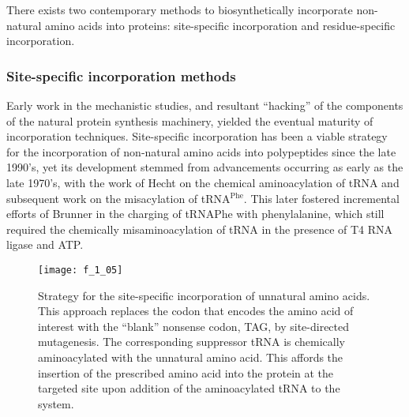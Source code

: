 \begin{refsection}
There exists two contemporary methods to biosynthetically incorporate
non-natural amino acids into proteins: site-specific incorporation and
residue-specific incorporation.

\subsubsection{Site-specific incorporation methods} 


Early work in the mechanistic studies, and resultant ``hacking'' of the
components of the natural protein synthesis machinery, yielded the eventual
maturity of incorporation techniques.  Site-specific incorporation has been a
viable strategy for the incorporation of non-natural amino acids into
polypeptides since the late 1990's, yet its development stemmed from
advancements occurring as early as the late 1970's, with the work of 
Hecht on the chemical aminoacylation of tRNA and subsequent work on the
misacylation of tRNA{$^\text{Phe}$}.\cite{Heckler1984,Hecht1978} This later
fostered incremental efforts of Brunner in the charging of tRNA{$\text{Phe}$}
with phenylalanine, which
still required the chemically misaminoacylation of tRNA in the presence of T4
RNA ligase and ATP.\cite{Baldini1988}
\begin{figure}[h!] \centering \texttt{[image: f\_1\_05]}
    \caption[Strategy for the site-specific incorporation of unnatural amino
    acids. This approach replaces the codon that encodes the amino acid of
    interest with the ``blank'' nonsense codon, TAG, by site-directed
    mutagenesis. The corresponding suppressor tRNA is chemically aminoacylated
     with the unnatural amino acid. This affords the insertion
    of the prescribed amino acid into the protein at the targeted site upon
    addition of the aminoacylated tRNA to the  system.]{Strategy for the site-specific incorporation of unnatural amino
    acids. This approach replaces the codon that encodes the amino acid of
    interest with the ``blank'' nonsense codon, TAG, by site-directed
    mutagenesis. The corresponding suppressor tRNA is chemically aminoacylated
     with the unnatural amino acid. This affords the insertion
    of the prescribed amino acid into the protein at the targeted site upon
    addition of the aminoacylated tRNA to the  system.
}
\end{figure}
\end{refsection}
